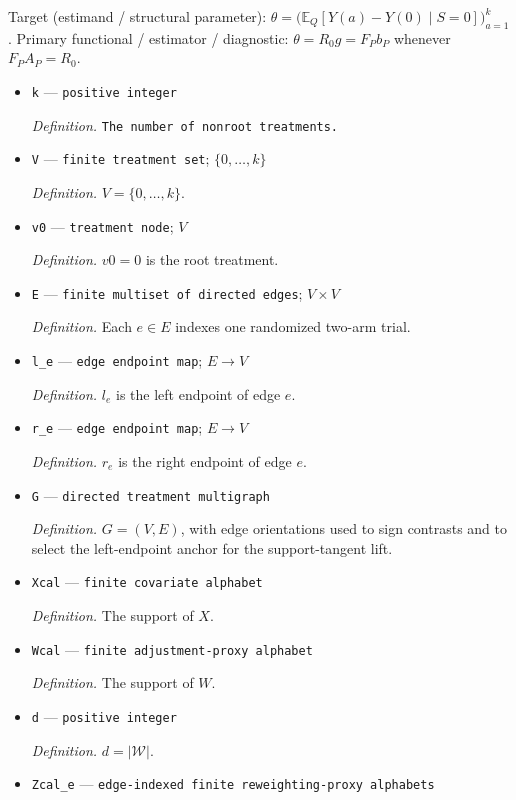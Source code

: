 \documentclass{article}
\begin{document}
Target (estimand / structural parameter): \(\theta=\bigl(\mathbb E_Q[Y(a)-Y(0)\mid S=0]\bigr)_{a=1}^{k}\).
Primary functional / estimator / diagnostic: \(\theta=R_0g=F_Pb_P\) whenever \(F_PA_P=R_0\).
\begin{itemize}
  \item \texttt{k} --- \texttt{positive integer}
  \par\smallskip\noindent\emph{Definition.} \texttt{The number of nonroot treatments.}
  \item \texttt{V} --- \texttt{finite treatment set}; \(\{0,\ldots,k\}\)
  \par\smallskip\noindent\emph{Definition.} \(V=\{0,\ldots,k\}\).
  \item \texttt{v0} --- \texttt{treatment node}; \(V\)
  \par\smallskip\noindent\emph{Definition.} \(v0=0\) is the root treatment.
  \item \texttt{E} --- \texttt{finite multiset of directed edges}; \(V\times V\)
  \par\smallskip\noindent\emph{Definition.} Each \(e\in E\) indexes one randomized two-arm trial.
  \item \texttt{l\_\allowbreak{}e} --- \texttt{edge endpoint map}; \(E\to V\)
  \par\smallskip\noindent\emph{Definition.} \(l_e\) is the left endpoint of edge \(e\).
  \item \texttt{r\_\allowbreak{}e} --- \texttt{edge endpoint map}; \(E\to V\)
  \par\smallskip\noindent\emph{Definition.} \(r_e\) is the right endpoint of edge \(e\).
  \item \texttt{G} --- \texttt{directed treatment multigraph}
  \par\smallskip\noindent\emph{Definition.} \(G=(V,E)\), with edge orientations used to sign contrasts and to select the left-endpoint anchor for the support-tangent lift.
  \item \texttt{Xcal} --- \texttt{finite covariate alphabet}
  \par\smallskip\noindent\emph{Definition.} The support of \(X\).
  \item \texttt{Wcal} --- \texttt{finite adjustment-\allowbreak{}proxy alphabet}
  \par\smallskip\noindent\emph{Definition.} The support of \(W\).
  \item \texttt{d} --- \texttt{positive integer}
  \par\smallskip\noindent\emph{Definition.} \(d=|\mathcal W|\).
  \item \texttt{Zcal\_\allowbreak{}e} --- \texttt{edge-\allowbreak{}indexed finite reweighting-\allowbreak{}proxy alphabets}

\end{itemize}
\end{document}
